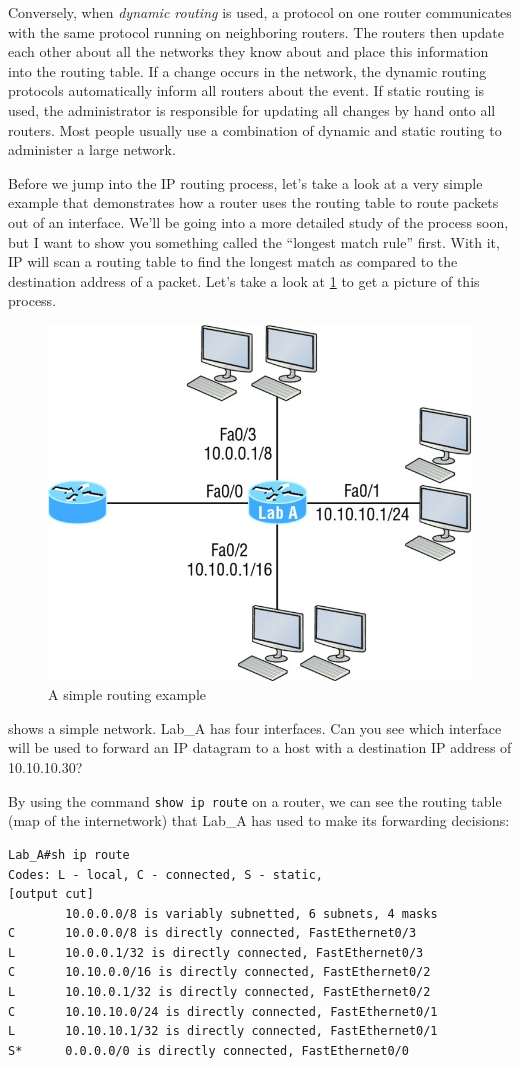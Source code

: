 Conversely, when \emph{dynamic routing} is used, a protocol on one
router communicates with the same protocol running on neighboring
routers. The routers then update each other about all the networks they
know about and place this information into the routing table. If a
change occurs in the network, the dynamic routing protocols
automatically inform all routers about the event. If static routing is
used, the administrator is responsible for updating all changes by hand
onto all routers. Most people usually use a combination of dynamic and
static routing to administer a large network.

Before we jump into the IP routing process, let's take a look at a very
simple example that demonstrates how a router uses the routing table to
route packets out of an interface. We'll be going into a more detailed
study of the process soon, but I want to show you something called the
``longest match rule'' first. With it, IP will scan a routing table to
find the longest match as compared to the destination address of a packet.
Let's take a look at \cref{fig:simple-routing-example} to get a picture of this process.


\begin{figure}
   \centering
   \includegraphics[width=.5\textwidth]{images/c09f001.jpg}
   \caption{A simple routing example}
   \label{fig:simple-routing-example}
\end{figure}


 shows a simple network.
Lab\_A has four interfaces.
Can you see which interface will be used to forward an IP datagram to a host with a destination IP address of 10.10.10.30?

By using the command \texttt{show\ ip\ route} on a router, we can see
the routing table (map of the internetwork) that Lab\_A has used to make
its forwarding decisions:

\begin{verbatim}
Lab_A#sh ip route
Codes: L - local, C - connected, S - static,
[output cut]
        10.0.0.0/8 is variably subnetted, 6 subnets, 4 masks
C       10.0.0.0/8 is directly connected, FastEthernet0/3
L       10.0.0.1/32 is directly connected, FastEthernet0/3
C       10.10.0.0/16 is directly connected, FastEthernet0/2
L       10.10.0.1/32 is directly connected, FastEthernet0/2
C       10.10.10.0/24 is directly connected, FastEthernet0/1
L       10.10.10.1/32 is directly connected, FastEthernet0/1
S*      0.0.0.0/0 is directly connected, FastEthernet0/0
\end{verbatim}

